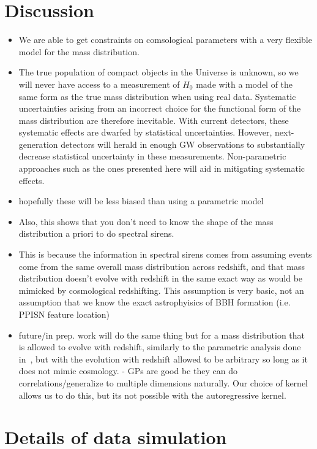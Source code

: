 \documentclass[]{aastex631}
\newcommand{\Ho}{$H_0$}
\begin{document}
\section{Discussion}
\label{sec:discussion}


\begin{itemize}
    \item We are able to get constraints on comsological parameters with a very flexible model for the mass distribution. 
    \item The true population of compact objects in the Universe is unknown, so we will never have access to a measurement of \Ho{} made with a model of the same form as the true mass distribution when using real data.
Systematic uncertainties arising from an incorrect choice for the functional form of the mass distribution are therefore inevitable.
With current detectors, these systematic effects are dwarfed by statistical uncertainties.
However, next-generation detectors will herald in enough GW observations to substantially decrease statistical uncertainty in these measurements.
Non-parametric approaches such as the ones presented here will aid in mitigating systematic effects.
    \item hopefully these will be less biased than using a parametric model
    \item Also, this shows that you don't need to know the shape of the mass distribution a priori to do spectral sirens.
    \item This is because the information in spectral sirens comes from assuming events come from the same overall mass distribution across redshift, and that mass distribution doesn't evolve with redshift in the same exact way as would be mimicked by cosmological redshifting. This assumption is very basic, not an assumption that we know the exact astrophyisics of BBH formation (i.e. PPISN feature location)
    \item future/in prep. work will do the same thing but for a mass distribution that is allowed to evolve with redshift, similarly to the parametric analysis done in~\cite{ezquiaga_spectral_2022}, but with the evolution with redshift allowed to be arbitrary so long as it does not mimic cosmology. - GPs are good bc they can do correlations/generalize to multiple dimensions naturally. Our choice of kernel allows us to do this, but its not possible with the autoregressive kernel.
\end{itemize}


\appendix
\section{Details of data simulation}
\end{document}

